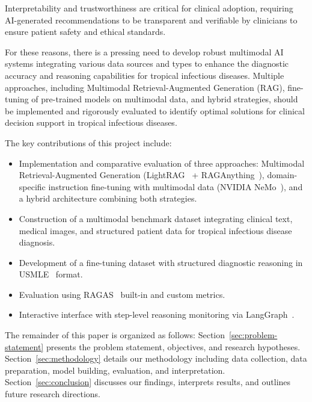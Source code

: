Interpretability and trustworthiness are critical for clinical adoption, requiring AI-generated recommendations to be transparent and verifiable by clinicians to ensure patient safety and ethical standards.

For these reasons, there is a pressing need to develop robust multimodal AI systems integrating various data sources and types to enhance the diagnostic accuracy and reasoning capabilities for tropical infectious diseases. Multiple approaches, including Multimodal Retrieval-Augmented Generation (RAG), fine-tuning of pre-trained models on multimodal data, and hybrid strategies, should be implemented and rigorously evaluated to identify optimal solutions for clinical decision support in tropical infectious diseases.


The key contributions of this project include:
\begin{itemize}
    \item Implementation and comparative evaluation of three approaches: Multimodal Retrieval-Augmented Generation (LightRAG~\cite{lightrag} + RAGAnything~\cite{raganything}), domain-specific instruction fine-tuning with multimodal data (NVIDIA NeMo~\cite{nemo}), and a hybrid architecture combining both strategies.
    \item Construction of a multimodal benchmark dataset integrating clinical text, medical images, and structured patient data for tropical infectious disease diagnosis.
    \item Development of a fine-tuning dataset with structured diagnostic reasoning in USMLE~\cite{usmle} format.
    \item Evaluation using RAGAS~\cite{ragas} built-in and custom metrics.
    \item Interactive interface with step-level reasoning monitoring via LangGraph~\cite{langgraph}.
\end{itemize}

The remainder of this paper is organized as follows: Section~\ref{sec:problem-statement} presents the problem statement, objectives, and research hypotheses. Section~\ref{sec:methodology} details our methodology including data collection, data preparation, model building, evaluation, and interpretation. Section~\ref{sec:conclusion} discusses our findings, interprets results, and outlines future research directions.
